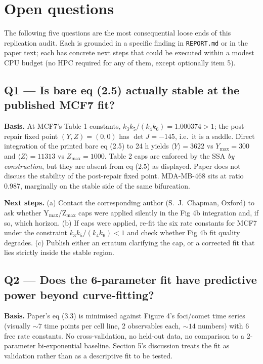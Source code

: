 \section{Open questions}\label{sec:open}

The following five questions are the most consequential loose ends of this replication audit.
Each is grounded in a specific finding in \texttt{REPORT.md} or in the paper text; each has
concrete next steps that could be executed within a modest CPU budget (no HPC required for
any of them, except optionally item 5).

\subsection*{Q1 --- Is bare eq (2.5) actually stable at the published MCF7 fit?}

\textbf{Basis.} At MCF7's Table 1 constants, $k_3 k_5/(k_4 k_6) = 1.000374 > 1$; the post-repair
fixed point $(Y,Z) = (0,0)$ has $\det J = -145$, i.e.\ it is a saddle. Direct integration of
the printed bare eq (2.5) to 24 h yields $\langle Y\rangle = 3622$ vs $Y_{\max} = 300$ and
$\langle Z\rangle = 11313$ vs $Z_{\max} = 1000$. Table 2 caps are enforced by the SSA \emph{by
construction}, but they are absent from eq (2.5) as displayed. Paper does not discuss the
stability of the post-repair fixed point. MDA-MB-468 sits at ratio 0.987, marginally on the
stable side of the same bifurcation.

\textbf{Next steps.} (a) Contact the corresponding author (S.\ J.\ Chapman, Oxford) to ask
whether Y$_{\max}$/Z$_{\max}$ caps were applied silently in the Fig 4b integration and, if so,
which horizon. (b) If caps were applied, re-fit the six rate constants for MCF7 under the
constraint $k_3 k_5/(k_4 k_6) < 1$ and check whether Fig 4b fit quality degrades. (c) Publish
either an erratum clarifying the cap, or a corrected fit that lies strictly inside the stable
region.

\subsection*{Q2 --- Does the 6-parameter fit have predictive power beyond curve-fitting?}

\textbf{Basis.} Paper's eq (3.3) is minimised against Figure 4's foci/comet time series
(visually $\sim 7$ time points per cell line, 2 observables each, $\sim 14$ numbers) with 6
free rate constants. No cross-validation, no held-out data, no comparison to a 2-parameter
bi-exponential baseline. Section 5's discussion treats the fit as validation rather than as a
descriptive fit to be tested.

